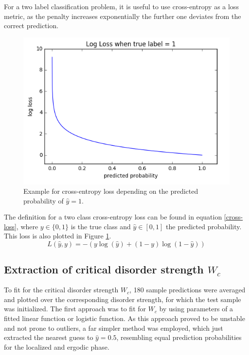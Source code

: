 \documentclass[reprint,amsmath,amssymb,aps,prb]{revtex4-2}
\begin{document}
For a two label classification problem, it is useful to use cross-entropy as a loss metric, as the penalty increases exponentially the further one deviates from the correct prediction.\cite{Goodfellow-et-al-2016}
\begin{figure}[h!]
\centering
\includegraphics[width=\linewidth]{figures/cross_entropy}
\caption{Example for cross-entropy loss depending on the predicted probability of $\hat{y}=1$.}
\label{fig:cross_entropy}
\end{figure}
The definition for a two class cross-entropy loss can be found in equation \ref{cross-loss}, where $y \in \{0,1\}$ is the true class and $\hat{y}\in\left[0,1\right]$ the predicted probability. This loss is also plotted in Figure \ref{fig:cross_entropy}.
\begin{equation}
L(\hat{y}, y)=-\left(y\log(\hat{y})+(1-y)\log(1-\hat{y})\right)\label{cross-loss}
\end{equation}

\subsection{Extraction of critical disorder strength $W_c$}\label{sec:wcextract}


To fit for the critical disorder strength $W_c$, 180 sample predictions were averaged and plotted over the corresponding disorder strength, for which the test sample was initialized. The first approach was to fit for $W_c$ by using parameters of a fitted linear function or logistic function. As this approach proved to be unstable and not prone to outliers, a far simpler method was employed, which just extracted the nearest guess to $\hat{y}=0.5$, resembling equal prediction probabilities for the localized and ergodic phase.
\end{document}
